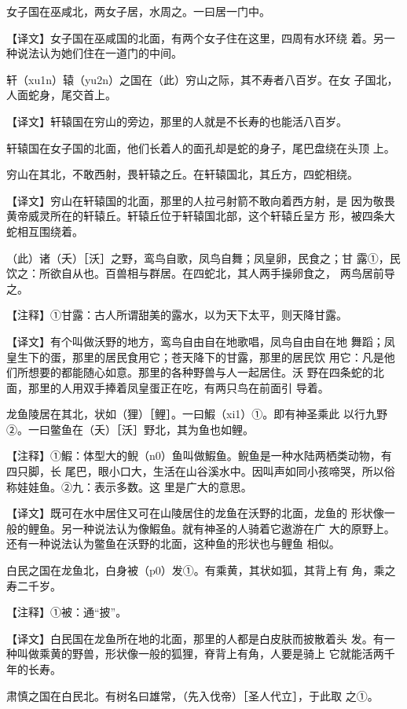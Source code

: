 \documentclass[a4paper,12pt,UTF8,twoside]{ctexbook}
\begin{document}
女子国在巫咸北，两女子居，水周之。一曰居一门中。

【译文】女子国在巫咸国的北面，有两个女子住在这里，四周有水环绕 着。另一种说法认为她们住在一道门的中间。

轩（xu1n）辕（yu2n）之国在（此）穷山之际，其不寿者八百岁。在女 子国北，人面蛇身，尾交首上。

【译文】轩辕国在穷山的旁边，那里的人就是不长寿的也能活八百岁。

轩辕国在女子国的北面，他们长着人的面孔却是蛇的身子，尾巴盘绕在头顶 上。

穷山在其北，不敢西射，畏轩辕之丘。在轩辕国北，其丘方，四蛇相绕。

【译文】穷山在轩辕国的北面，那里的人拉弓射箭不敢向着西方射，是 因为敬畏黄帝威灵所在的轩辕丘。轩辕丘位于轩辕国北部，这个轩辕丘呈方 形，被四条大蛇相互围绕着。

（此）诸（夭）［沃］之野，鸾鸟自歌，凤鸟自舞；凤皇卵，民食之；甘 露①，民饮之：所欲自从也。百兽相与群居。在四蛇北，其人两手操卵食之， 两鸟居前导之。

【注释】①甘露：古人所谓甜美的露水，以为天下太平，则天降甘露。

【译文】有个叫做沃野的地方，鸾鸟自由自在地歌唱，凤鸟自由自在地 舞蹈；凤皇生下的蛋，那里的居民食用它；苍天降下的甘露，那里的居民饮 用它：凡是他们所想要的都能随心如意。那里的各种野兽与人一起居住。沃 野在四条蛇的北面，那里的人用双手捧着凤皇蛋正在吃，有两只鸟在前面引 导着。

龙鱼陵居在其北，状如（狸）［鲤］。一曰鰕（xi1）①。即有神圣乘此 以行九野②。一曰鳖鱼在（夭）［沃］野北，其为鱼也如鲤。

【注释】①鰕：体型大的鲵（n0）鱼叫做鰕鱼。鲵鱼是一种水陆两栖类动物，有四只脚，长 尾巴，眼小口大，生活在山谷溪水中。因叫声如同小孩啼哭，所以俗称娃娃鱼。②九：表示多数。这 里是广大的意思。

【译文】既可在水中居住又可在山陵居住的龙鱼在沃野的北面，龙鱼的 形状像一般的鲤鱼。另一种说法认为像鰕鱼。就有神圣的人骑着它遨游在广 大的原野上。还有一种说法认为鳖鱼在沃野的北面，这种鱼的形状也与鲤鱼 相似。

白民之国在龙鱼北，白身被（p0）发①。有乘黄，其状如狐，其背上有 角，乘之寿二千岁。

【注释】①被：通“披”。

【译文】白民国在龙鱼所在地的北面，那里的人都是白皮肤而披散着头 发。有一种叫做乘黄的野兽，形状像一般的狐狸，脊背上有角，人要是骑上 它就能活两千年的长寿。

肃慎之国在白民北。有树名曰雄常，（先入伐帝）［圣人代立］，于此取 之①。
\end{document}
